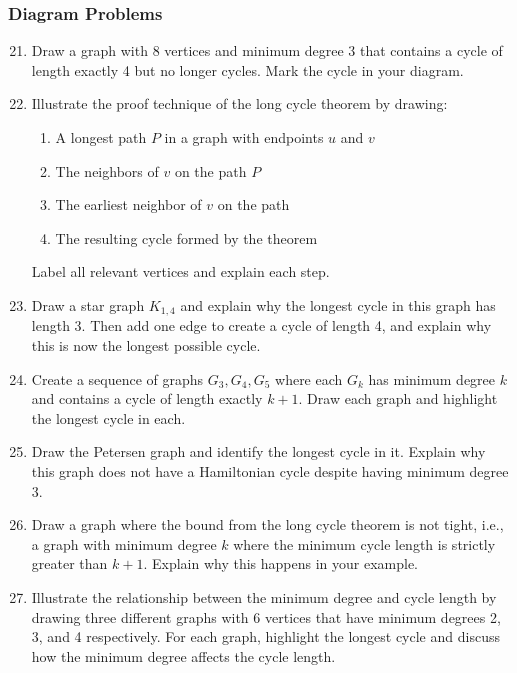 \documentclass{article}
\theoremstyle{definition}
\begin{document}
\subsubsection{Diagram Problems}
\begin{enumerate}\setcounter{enumi}{20}
\item Draw a graph with 8 vertices and minimum degree 3 that contains a cycle of length exactly 4 but no longer cycles. Mark the cycle in your diagram.

\item Illustrate the proof technique of the long cycle theorem by drawing:
\begin{enumerate}
\item A longest path $P$ in a graph with endpoints $u$ and $v$
\item The neighbors of $v$ on the path $P$
\item The earliest neighbor of $v$ on the path
\item The resulting cycle formed by the theorem
\end{enumerate}
Label all relevant vertices and explain each step.

\item Draw a star graph $K_{1,4}$ and explain why the longest cycle in this graph has length 3. Then add one edge to create a cycle of length 4, and explain why this is now the longest possible cycle.

\item Create a sequence of graphs $G_3, G_4, G_5$ where each $G_k$ has minimum degree $k$ and contains a cycle of length exactly $k+1$. Draw each graph and highlight the longest cycle in each.

\item Draw the Petersen graph and identify the longest cycle in it. Explain why this graph does not have a Hamiltonian cycle despite having minimum degree 3.

\item Draw a graph where the bound from the long cycle theorem is not tight, i.e., a graph with minimum degree $k$ where the minimum cycle length is strictly greater than $k+1$. Explain why this happens in your example.

\item Illustrate the relationship between the minimum degree and cycle length by drawing three different graphs with 6 vertices that have minimum degrees 2, 3, and 4 respectively. For each graph, highlight the longest cycle and discuss how the minimum degree affects the cycle length.
\end{enumerate}
\end{document}
